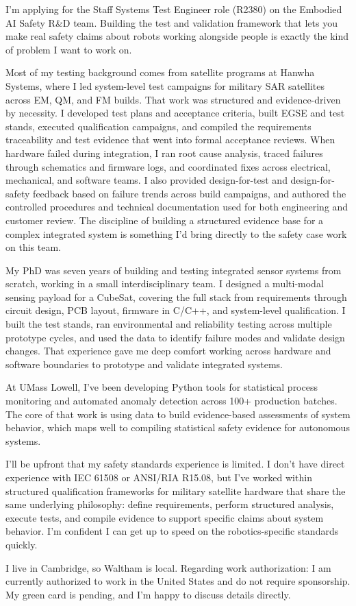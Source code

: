 \documentclass[letterpaper,11pt]{moderncv}
\date{\today}
\begin{document}
\makelettertitle

I'm applying for the Staff Systems Test Engineer role (R2380) on the Embodied AI Safety R\&D team. Building the test and validation framework that lets you make real safety claims about robots working alongside people is exactly the kind of problem I want to work on.

Most of my testing background comes from satellite programs at Hanwha Systems, where I led system-level test campaigns for military SAR satellites across EM, QM, and FM builds. That work was structured and evidence-driven by necessity. I developed test plans and acceptance criteria, built EGSE and test stands, executed qualification campaigns, and compiled the requirements traceability and test evidence that went into formal acceptance reviews. When hardware failed during integration, I ran root cause analysis, traced failures through schematics and firmware logs, and coordinated fixes across electrical, mechanical, and software teams. I also provided design-for-test and design-for-safety feedback based on failure trends across build campaigns, and authored the controlled procedures and technical documentation used for both engineering and customer review. The discipline of building a structured evidence base for a complex integrated system is something I'd bring directly to the safety case work on this team.

My PhD was seven years of building and testing integrated sensor systems from scratch, working in a small interdisciplinary team. I designed a multi-modal sensing payload for a CubeSat, covering the full stack from requirements through circuit design, PCB layout, firmware in C/C++, and system-level qualification. I built the test stands, ran environmental and reliability testing across multiple prototype cycles, and used the data to identify failure modes and validate design changes. That experience gave me deep comfort working across hardware and software boundaries to prototype and validate integrated systems.

At UMass Lowell, I've been developing Python tools for statistical process monitoring and automated anomaly detection across 100+ production batches. The core of that work is using data to build evidence-based assessments of system behavior, which maps well to compiling statistical safety evidence for autonomous systems.

I'll be upfront that my safety standards experience is limited. I don't have direct experience with IEC 61508 or ANSI/RIA R15.08, but I've worked within structured qualification frameworks for military satellite hardware that share the same underlying philosophy: define requirements, perform structured analysis, execute tests, and compile evidence to support specific claims about system behavior. I'm confident I can get up to speed on the robotics-specific standards quickly.

I live in Cambridge, so Waltham is local. Regarding work authorization: I am currently authorized to work in the United States and do not require sponsorship. My green card is pending, and I'm happy to discuss details directly.

\makeletterclosing
\end{document}
